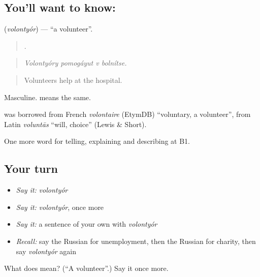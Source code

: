 \subsection*{You'll want to know: }
\textbf{} (\emph{volontyór}) — \textquotedblleft{}a volunteer\textquotedblright{}.

\begin{quote}
   .
\end{quote}

\begin{quote}
\emph{Volontyóry pomogáyut v bolnítse.}
\end{quote}

\begin{quote}
Volunteers help at the hospital.
\end{quote}

Masculine. \emph{} means the same.

\begin{cousinweb}
\textbf{} was borrowed from French \emph{volontaire} (EtymDB) \textquotedblleft{}voluntary, a volunteer\textquotedblright{}, from Latin \emph{voluntās} \textquotedblleft{}will, choice\textquotedblright{} (Lewis \& Short).
\end{cousinweb}

\begin{grammarlens}[title={What you've built}]
One more word for telling, explaining and describing at B1.
\end{grammarlens}

\subsection*{Your turn}
\begin{itemize}
\raggedright
  \item \emph{Say it:} \emph{volontyór}
  \item \emph{Say it:} \emph{volontyór}, once more
  \item \emph{Say it:} a sentence of your own with \emph{volontyór}
  \item \emph{Recall:} say the Russian for unemployment, then the Russian for charity, then say \emph{volontyór} again
\end{itemize}

\begin{tcolorbox}[breakable,colback=teal!4,colframe=teal!35!black,title={Before you move on}]
What does  mean? (\textquotedblleft{}A volunteer\textquotedblright{}.) Say it once more.
\end{tcolorbox}
